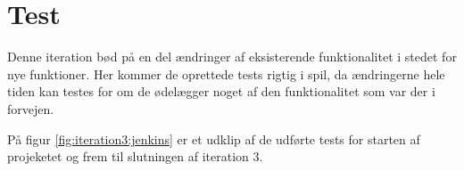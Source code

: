 \section{Test}

Denne iteration bød på en del ændringer af eksisterende funktionalitet i stedet for nye funktioner. Her kommer de oprettede tests rigtig i spil, da ændringerne hele tiden kan testes for om de ødelægger noget af den funktionalitet som var der i forvejen.

På figur \ref{fig:iteration3:jenkins} er et udklip af de udførte tests for starten af projeketet og frem til slutningen af iteration 3.

